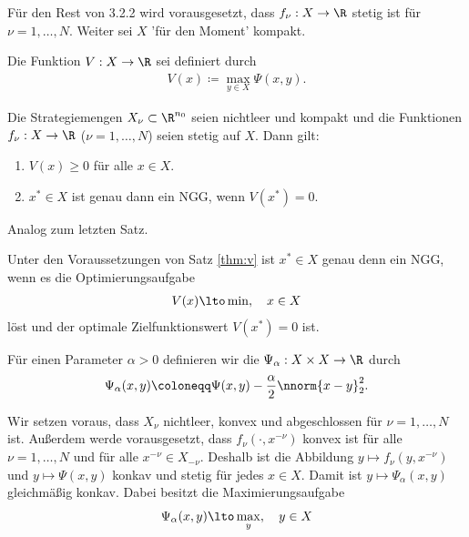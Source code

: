 Für den Rest von 3.2.2 wird vorausgesetzt, dass $ f_{\nu}: X \to \R$ stetig ist für $ \nu = 1, \dots, N$. Weiter sei $X$ 'für den Moment' kompakt. 
\begin{definition*}
  Die Funktion $V: X \to \R$ sei definiert durch
  \begin{align*}
    V(x) \coloneqq \max_{y \in X} \Psi(x, y). 
  \end{align*}
\end{definition*}
\begin{satz}\label{thm:v}
  Die Strategiemengen $X_{\nu} \subset \R^{n_{0}}$ seien nichtleer und kompakt und die Funktionen $f_{\nu}: X \to \R$ ($\nu = 1, \dots, N$) seien stetig auf $X$. Dann gilt:
  \begin{enumerate}
  \item $V(x) \geq 0$ für alle $x \in X$. 
  \item $x^{*} \in X$ ist genau dann ein NGG, wenn $V(x^{*})= 0$. 
  \end{enumerate}
\end{satz}
\begin{beweis}
  Analog zum letzten Satz. 
\end{beweis}
\begin{korollar}
Unter den Voraussetzungen von Satz \ref{thm:v} ist $x^{*} \in X$ genau denn ein NGG, wenn es die Optimierungsaufgabe
\begin{align*}
  V(x) \lto \min, \quad x \in X
\end{align*}
löst und der optimale Zielfunktionswert $V(x^{*})= 0$ ist. 
\end{korollar}
\begin{definition*}
  Für einen Parameter $\alpha > 0$ definieren wir die  $\Psi_{\alpha}: X \times X \to \R$ durch
  \begin{align*}
    \Psi_{\alpha}(x, y) \coloneqq \Psi(x, y) - \frac \alpha 2 \nnorm{x - y}_{2}^{2}. 
  \end{align*}
\end{definition*}
Wir setzen voraus, dass $X_{\nu}$ nichtleer, konvex und abgeschlossen für $\nu = 1, \dots, N$ ist. Außerdem werde vorausgesetzt, dass $f_{\nu}(\cdot, x^{- \nu})$ konvex ist für alle $ \nu = 1, \dots, N$ und für alle $x^{-\nu} \in X_{-\nu}$. 
Deshalb ist die Abbildung $y \mapsto f_{\nu}(y, x^{-\nu})$ und $y \mapsto \Psi(x, y)$ konkav und stetig für jedes $ x\in X$. Damit ist $y \mapsto \Psi_{\alpha}(x, y)$ gleichmäßig konkav. Dabei besitzt die Maximierungsaufgabe
\begin{align*}
  \Psi_{\alpha}(x, y) \lto \max_{y}, \quad y \in X
\end{align*}
